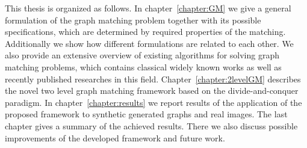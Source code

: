 This thesis is organized as follows. In chapter~\ref{chapter:GM} we give a general formulation of the graph matching problem together with its possible specifications, which are determined by required properties of the matching. Additionally we show how different formulations are related to each other. We also provide an extensive overview of existing algorithms for solving graph matching problems, which contains classical widely known works as well as recently published researches in this field.
Chapter~\ref{chapter:2levelGM} describes the novel two level graph matching framework based on the divide-and-conquer paradigm. %
In chapter~\ref{chapter:results} we report results of the application of the proposed framework to synthetic generated graphs and real images. The last chapter gives a summary of the achieved results. There we also discuss possible improvements of the developed framework and future work.
